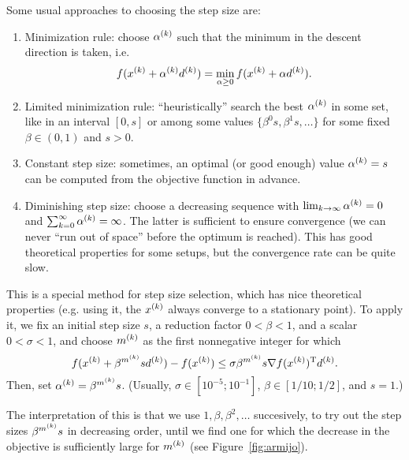 \documentclass{article}
\begin{document}
Some usual approaches to choosing the step size are:
\begin{enumerate}
\item Minimization rule: choose \(\alpha^{(k)}\) such that the minimum in the descent direction is
  taken, i.e.
  \begin{equation*}
    f(x^{(k)} + \alpha^{(k)}d^{(k)}) = \min_{\alpha \geq 0} f(x^{(k)} + \alpha d^{(k)}).
  \end{equation*}
\item Limited minimization rule: ``heuristically'' search the best \(\alpha^{(k)}\) in some set,
  like in an interval \([0, s]\) or among some values \(\{\beta^0 s, \beta^1 s, \ldots \}\) for some
  fixed \(\beta \in (0, 1)\) and \(s > 0\).
\item Constant step size: sometimes, an optimal (or good enough) value \(\alpha^{(k)} = s\) can be
  computed from the objective function in advance.
\item Diminishing step size: choose a decreasing sequence with
  \(\lim_{k \to \infty} \alpha^{(k)} = 0\) and \(\sum_{k = 0}^{\infty} \alpha^{(k)} = \infty\).  The
  latter is sufficient to ensure convergence (we can never ``run out of space'' before the optimum
  is reached).  This has good theoretical properties for some setups, but the convergence rate can
  be quite slow.
\end{enumerate}


\label{s:armijo-rule}

This is a special method for step size selection, which has nice theoretical properties (e.g. using
it, the \(x^{(k)}\) always converge to a stationary point).  To apply it, we fix an initial step
size \(s\), a reduction factor \(0 < \beta < 1\), and a scalar \(0 < \sigma < 1\), and choose
\(m^{(k)}\) as the first nonnegative integer for which
\begin{equation*}
  f(x^{(k)} + \beta^{m^{(k)}} s d^{(k)}) - f(x^{(k)}) \leq \sigma \beta^{m^{(k)}} s \nabla f(x^{(k)})^{\mathrm{T}} d^{(k)}.
\end{equation*}
Then, set \(\alpha^{(k)} = \beta^{m^{(k)}} s\).  (Usually, \(\sigma \in [10^{-5}; 10^{-1}]\),
\(\beta \in [1/10; 1/2]\), and \(s = 1\).)

The interpretation of this is that we use \(1, \beta, \beta^2, \ldots\) succesively, to try out the
step sizes \(\beta^{m^{(k)}} s\) in decreasing order, until we find one for which the decrease in
the objective is sufficiently large for \(m^{(k)}\) (see Figure~\ref{fig:armijo}).
\end{document}
